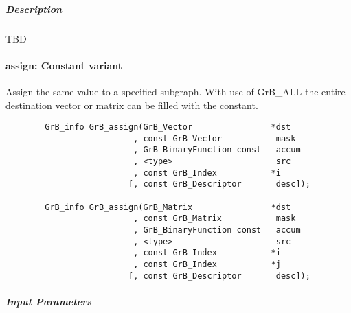 \subparagraph{Description}

TBD

\paragraph{{\sf assign}: Constant variant}

Assign the same value to a specified subgraph.  With use of {\sf GrB\_ALL} the entire
destination vector or matrix can be filled with the constant.


\begin{verbatim}
        GrB_info GrB_assign(GrB_Vector                *dst
                          , const GrB_Vector           mask
                          , GrB_BinaryFunction const   accum
                          , <type>                     src
                          , const GrB_Index           *i
                         [, const GrB_Descriptor       desc]);

        GrB_info GrB_assign(GrB_Matrix                *dst
                          , const GrB_Matrix           mask
                          , GrB_BinaryFunction const   accum
                          , <type>                     src
                          , const GrB_Index           *i
                          , const GrB_Index           *j
                         [, const GrB_Descriptor       desc]);
\end{verbatim}

\subparagraph{Input Parameters}

